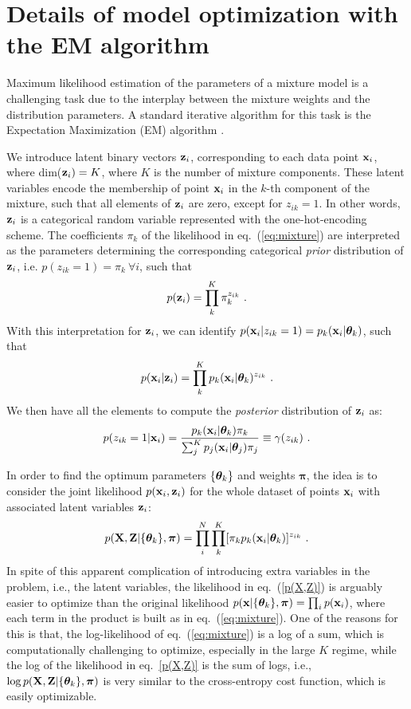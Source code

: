 \section{Details of model optimization with the EM algorithm}
\label{app:EM}

Maximum likelihood estimation of the parameters of a mixture model is a challenging task due to the interplay between the mixture weights and the distribution parameters. 
A standard iterative algorithm for this task is the  Expectation Maximization (EM) algorithm \cite{bishop, Hastie:2009}. 

We introduce latent binary vectors ${\bf z}_i$, corresponding to each data point $\textbf{x}_i$, where dim(${\bf z}_i)=K$, where $K$ is the number of mixture components. These latent variables encode the membership of point $\textbf{x}_i$ in the $k$-th component of the mixture, such that all elements of ${\bf z}_i$ are zero, except for $z_{ik}=1$. In other words, ${\bf z}_i$ is a categorical random variable represented with the one-hot-encoding scheme. The coefficients $\pi_k$ of the likelihood in eq.~(\ref{eq:mixture}) are interpreted as the parameters determining the corresponding categorical {\it prior} distribution of ${\bf z}_i$, i.e. $p(z_{ik}=1)=\pi_k~\forall i$, such that  
\begin{equation}
 p({\bf z}_i) = \prod_k^K \pi_k^{z_{ik}} ~.  
\end{equation}
With this interpretation for ${\bf z}_i$, we can identify $ p(\textbf{x}_i | z_{ik}=1) = p_k(\textbf{x}_i|\boldsymbol{\theta}_k)$, such that
\begin{equation}
p(\textbf{x}_i|{\bf z}_i) = \prod_k^K p_k(\textbf{x}_i|\boldsymbol{\theta}_k)^{z_{ik}}~.
\end{equation}
We then have all the elements to compute the {\it posterior} distribution of ${\bf z}_i$ as:
\begin{equation}
p(z_{ik}=1 | \textbf{x}_i) = \frac{p_k(\textbf{x}_i|\boldsymbol{\theta}_k) \pi_k}
{\sum_j^K p_j(\textbf{x}_i|\boldsymbol{\theta}_j) \pi_j} \equiv \gamma(z_{ik})~.
\label{gamma}
\end{equation}

In order to find the optimum parameters $\{\boldsymbol{\theta}_k\}$ and weights $\boldsymbol{\pi}$, the idea is to consider the joint likelihood $p(\textbf{x}_i, {\bf z}_i)$ 
for the whole dataset of points $\textbf{x}_i$ with associated latent variables ${\bf z}_i$:
\begin{equation}
\label{p(X,Z)}
p({\bf X,Z}|\{\boldsymbol{\theta}_k\},\boldsymbol{\pi})
=\prod_i^N \prod_k^K [\pi_k p_k(\textbf{x}_i|\boldsymbol{\theta}_k)]^{z_{ik}}~.
\end{equation}
In spite of this apparent complication of introducing extra variables in the problem, i.e., the latent variables, the likelihood in eq.~(\ref{p(X,Z)}) is arguably easier to optimize than the original likelihood $p(\textbf{x}|\{\boldsymbol{\theta}_k\},\boldsymbol{\pi}) = \prod_i p(\textbf{x}_i)$, where each term in the product is built as in eq.~(\ref{eq:mixture}). One of the reasons for this is that, the log-likelihood of eq.~(\ref{eq:mixture}) is a log of a sum, which is computationally challenging to optimize, especially in the large $K$ regime, while the log of the likelihood in eq.~\ref{p(X,Z)} is the sum of logs, i.e., $\log p({\bf X,Z}|\{\boldsymbol{\theta}_k\},\boldsymbol{\pi})$ is very similar to the cross-entropy cost function, which is easily optimizable.  

